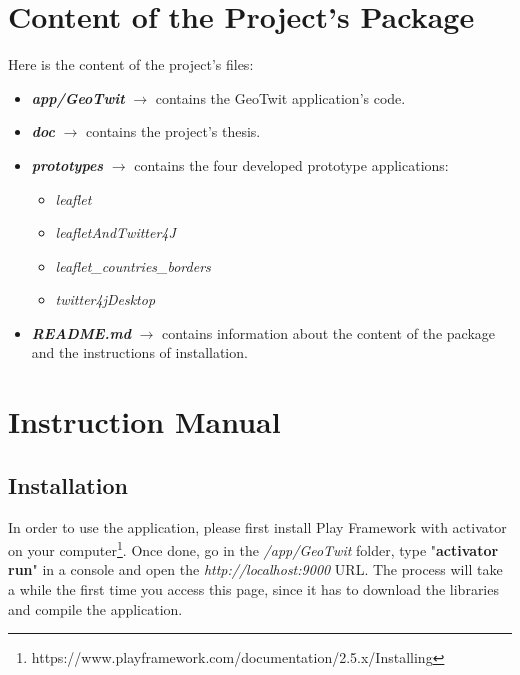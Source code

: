 \documentclass[a4paper,11pt]{report}
\begin{document}
\appendix
\titleformat{\chapter}[display]   
{\normalfont\huge\bfseries}{\chaptertitlename\ \thechapter}{20pt}{\Huge}   
\titlespacing*{\chapter}{0pt}{-30pt}{40pt}

\chapter{Content of the Project's Package}
Here is the content of the project's files:
\begin{itemize}
	\item \textbf{\emph{app/GeoTwit}} $\to$ contains the GeoTwit application's code.
	\item \textbf{\emph{doc}} $\to$ contains the project's thesis.
	\item \textbf{\emph{prototypes}} $\to$ contains the four developed prototype applications:
		\begin{itemize}
			\item \emph{leaflet}
			\item \emph{leafletAndTwitter4J}
			\item \emph{leaflet\_countries\_borders}
			\item \emph{twitter4jDesktop}
		\end{itemize}
	\item \textbf{\emph{README.md}} $\to$ contains information about the content of the package and the instructions of installation.
\end{itemize}

\chapter{Instruction Manual}
\label{instruction}
\section{Installation}
In order to use the application, please first install Play Framework with activator on your computer\footnote{https://www.playframework.com/documentation/2.5.x/Installing}. Once done, go in the \emph{/app/GeoTwit} folder, type "\textbf{activator run}" in a console and open the \emph{http://localhost:9000} URL. The process will take a while the first time you access this page, since it has to download the libraries and compile the application.
\bigskip
\end{document}
